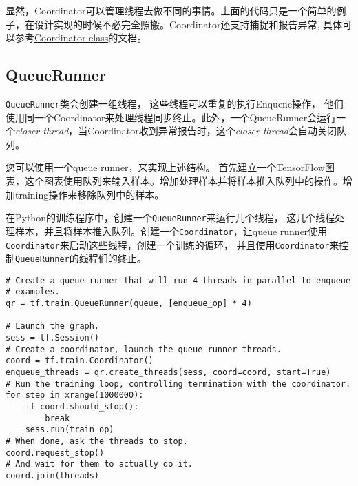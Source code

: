 显然，Coordinator可以管理线程去做不同的事情。上面的代码只是一个简单的例子，在设计实现的时候不必完全照搬。Coordinator还支持捕捉和报告异常,
具体可以参考\href{tensorflow-zh/SOURCE/api_docs/python/train.md\#Coordinator}{Coordinator
class}的文档。

\subsection{QueueRunner }\label{queuerunner}

\texttt{QueueRunner}类会创建一组线程，
这些线程可以重复的执行Enquene操作，
他们使用同一个Coordinator来处理线程同步终止。此外，一个QueueRunner会运行一个\emph{closer
thread}，当Coordinator收到异常报告时，这个\emph{closer
thread}会自动关闭队列。

您可以使用一个queue runner，来实现上述结构。
首先建立一个TensorFlow图表，这个图表使用队列来输入样本。增加处理样本并将样本推入队列中的操作。增加training操作来移除队列中的样本。

\begin{Shaded}
\begin{Highlighting}[]
\OperatorTok{=} 
\OperatorTok{=} 
\OperatorTok{=} 
\OperatorTok{=} 
\OperatorTok{=}  
\end{Highlighting}
\end{Shaded}

在Python的训练程序中，创建一个\texttt{QueueRunner}来运行几个线程，
这几个线程处理样本，并且将样本推入队列。创建一个\texttt{Coordinator}，让queue
runner使用\texttt{Coordinator}来启动这些线程，创建一个训练的循环，
并且使用\texttt{Coordinator}来控制\texttt{QueueRunner}的线程们的终止。

\begin{verbatim}
# Create a queue runner that will run 4 threads in parallel to enqueue
# examples.
qr = tf.train.QueueRunner(queue, [enqueue_op] * 4)

# Launch the graph.
sess = tf.Session()
# Create a coordinator, launch the queue runner threads.
coord = tf.train.Coordinator()
enqueue_threads = qr.create_threads(sess, coord=coord, start=True)
# Run the training loop, controlling termination with the coordinator.
for step in xrange(1000000):
    if coord.should_stop():
        break
    sess.run(train_op)
# When done, ask the threads to stop.
coord.request_stop()
# And wait for them to actually do it.
coord.join(threads)
\end{verbatim}

